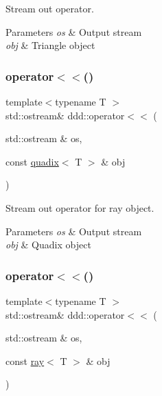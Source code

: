 Stream out operator. 


\begin{DoxyParams}{Parameters}
{\em os} & Output stream \\
\hline
{\em obj} & Triangle object \\
\hline
\end{DoxyParams}
\mbox{\label{namespaceddd_a58ae88cefdf3b919e400db6de59f4cfc}} 
\subsubsection{\texorpdfstring{operator$<$$<$()}{operator<<()}\hspace{0.1cm}{\footnotesize\ttfamily [7/10]}}
{\footnotesize\ttfamily template$<$typename T $>$ \\
std\+::ostream\& ddd\+::operator$<$$<$ (\begin{DoxyParamCaption}\item[{std\+::ostream \&}]{os,  }\item[{const \hyperlink{classddd_1_1quadix}{quadix}$<$ T $>$ \&}]{obj }\end{DoxyParamCaption})\hspace{0.3cm}{\ttfamily [inline]}}



Stream out operator for ray object. 


\begin{DoxyParams}{Parameters}
{\em os} & Output stream \\
\hline
{\em obj} & Quadix object \\
\hline
\end{DoxyParams}
\mbox{\label{namespaceddd_ae2604d6c72853dfb2595f6882cbc7a51}} 
\subsubsection{\texorpdfstring{operator$<$$<$()}{operator<<()}\hspace{0.1cm}{\footnotesize\ttfamily [8/10]}}
{\footnotesize\ttfamily template$<$typename T $>$ \\
std\+::ostream\& ddd\+::operator$<$$<$ (\begin{DoxyParamCaption}\item[{std\+::ostream \&}]{os,  }\item[{const \hyperlink{classddd_1_1ray}{ray}$<$ T $>$ \&}]{obj }\end{DoxyParamCaption})\hspace{0.3cm}{\ttfamily [inline]}}



